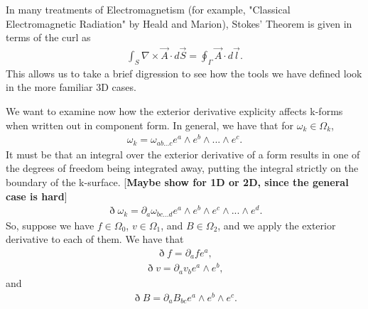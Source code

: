 \documentclass{book}
\begin{document}
In many treatments of Electromagnetism (for example, "Classical Electromagnetic Radiation" by Heald and Marion), Stokes' Theorem is given in terms of the curl as \begin{gather}\int_S \nabla \times \vec{A} \cdot d\vec{S} = \oint_{\Gamma} \vec{A} \cdot d\vec{l}.\end{gather} This allows us to take a brief digression to see how the tools we have defined look in the more familiar 3D cases. 

We want to examine now how the exterior derivative explicity affects k-forms when written out in component form. In general, we have that for $\omega_k \in \Omega_k$, \begin{gather}\omega_k = \omega_{ab...c}e^a\wedge e^b \wedge ... \wedge e^c.\end{gather} It must be that an integral over the exterior derivative of a form results in one of the degrees of freedom being integrated away, putting the integral strictly on the boundary of the k-surface. [\textbf{Maybe show for 1D or 2D, since the general case is hard}]\begin{gather} \eth \omega_k = \partial_a\omega_{bc...d}e^a\wedge e^b\wedge e^c\wedge ... \wedge e^d.\end{gather} So, suppose we have $f \in \Omega_0$, $v \in \Omega_1$, and $B \in \Omega_2$, and we apply the exterior derivative to each of them. We have that \begin{gather}\eth f = \partial_a f e^a,\end{gather} \begin{gather}\eth v = \partial_a v_b e^a \wedge e^b,\end{gather} and \begin{gather}\eth B = \partial_a B_{bc} e^a\wedge e^b \wedge e^c.\end{gather} 
\end{document}
